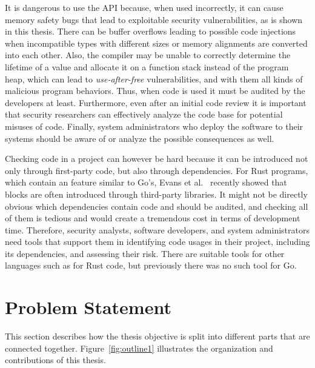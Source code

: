 It is dangerous to use the \unsafe{} \acrshort{API} because, when used incorrectly, it can cause memory safety bugs that
lead to exploitable security vulnerabilities, as is shown in this thesis.
There can be buffer overflows leading to possible code injections when incompatible types with different sizes or
memory alignments are converted into each other.
Also, the compiler may be unable to correctly determine the lifetime of a value and allocate it on a function stack
instead of the program heap, which can lead to \textit{use-after-free} vulnerabilities, and with them all kinds of
malicious program behaviors.
Thus, when \unsafe{} code is used it must be audited by the developers at least.
Furthermore, even after an initial code review it is important that security researchers can effectively analyze the
code base for potential misuses of \unsafe{} code.
Finally, system administrators who deploy the software to their systems should be aware of or analyze the possible
consequences as well.

Checking \unsafe{} code in a project can however be hard because it can be introduced not only through first-party
code, but also through dependencies.
For Rust programs, which contain an \unsafe{} feature similar to Go's, Evans et al.~\cite{evans2020} recently showed
that \unsafe{} blocks are often introduced through third-party libraries.
It might not be directly obvious which dependencies contain \unsafe{} code and should be audited, and checking all of
them is tedious and would create a tremendous cost in terms of development time.
Therefore, security analysts, software developers, and system administrators need tools that support them in identifying
\unsafe{} code usages in their project, including its dependencies, and assessing their risk.
There are suitable tools for other languages such as \toolCargoGeiger{} for Rust code, but previously there was no such
tool for Go.



\section{Problem Statement}\label{sec:introduction:problem-statement}

This section describes how the thesis objective is split into different parts that are connected together.
Figure~\ref{fig:outline1} illustrates the organization and contributions of this thesis.

